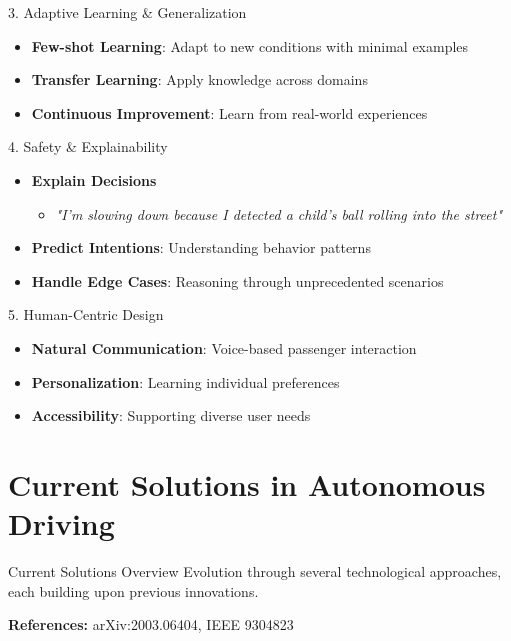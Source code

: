 \documentclass[aspectratio=169]{beamer}
\begin{document}
\begin{frame}{3. Adaptive Learning \& Generalization}
    \begin{itemize}
        \item \textbf{Few-shot Learning}: Adapt to new conditions with minimal examples
        \item \textbf{Transfer Learning}: Apply knowledge across domains
        \item \textbf{Continuous Improvement}: Learn from real-world experiences
    \end{itemize}
\end{frame}

\begin{frame}{4. Safety \& Explainability}
    \begin{itemize}
        \item \textbf{Explain Decisions}
            \begin{itemize}
                \item \textit{"I'm slowing down because I detected a child's ball rolling into the street"}
            \end{itemize}
        \item \textbf{Predict Intentions}: Understanding behavior patterns
        \item \textbf{Handle Edge Cases}: Reasoning through unprecedented scenarios
    \end{itemize}
\end{frame}

\begin{frame}{5. Human-Centric Design}
    \begin{itemize}
        \item \textbf{Natural Communication}: Voice-based passenger interaction
        \item \textbf{Personalization}: Learning individual preferences
        \item \textbf{Accessibility}: Supporting diverse user needs
    \end{itemize}
\end{frame}

\section{Current Solutions in Autonomous Driving}

\begin{frame}{Current Solutions Overview}
    Evolution through several technological approaches, each building upon previous innovations.
    
    \vspace{0.5cm}
    \begin{center}
        \textbf{References:} arXiv:2003.06404, IEEE 9304823
    \end{center}
\end{frame}
\end{document}
